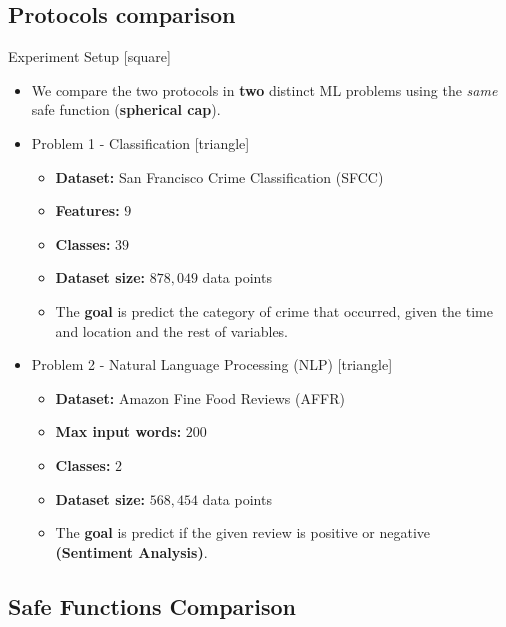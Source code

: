 \subsection{Protocols comparison}\label{subsec:protocols-comparison}

\begin{frame}{Experiment Setup}
    [square]
    \begin{itemize}
        \item{We compare the two protocols in \textbf{two} distinct ML problems using the \emph{same} safe function (\textbf{spherical cap}).}
        \item{Problem 1 - Classification
        [triangle]
        \begin{itemize}
            \item{\textbf{Dataset:} San Francisco Crime Classification (SFCC)}
            \item{\textbf{Features:} $9$}
            \item{\textbf{Classes:} $39$}
            \item{\textbf{Dataset size:} $878,049$ data points}
            \item{The \textbf{goal} is predict the category of crime that occurred, given the time and location and the rest of
            variables.}
        \end{itemize}
        }
        \item{Problem 2 - Natural Language Processing (NLP)
        [triangle]
        \begin{itemize}
            \item{\textbf{Dataset:} Amazon Fine Food Reviews (AFFR)}
            \item{\textbf{Max input words:} $200$}
            \item{\textbf{Classes:} $2$}
            \item{\textbf{Dataset size:} $568,454$ data points}
            \item{The \textbf{goal} is predict if the given review is positive or negative\\\textbf{(Sentiment Analysis)}.}
        \end{itemize}
        }
    \end{itemize}
\end{frame}

\subsection{Safe Functions Comparison}\label{subsec:safe-functions-comparison}

